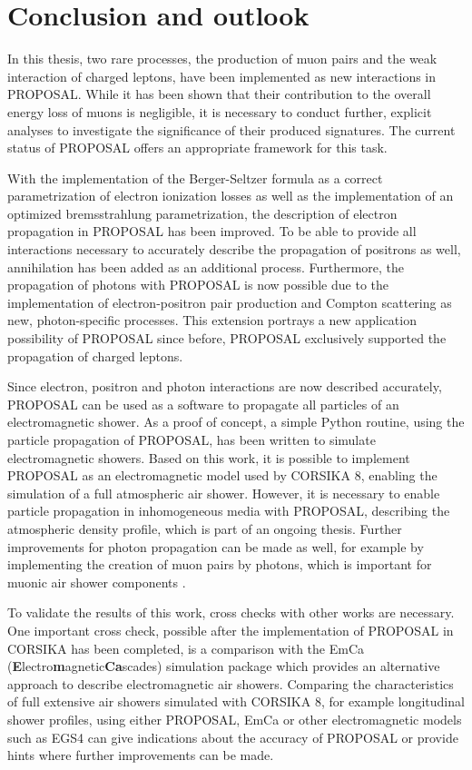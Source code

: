 \chapter{Conclusion and outlook} 

In this thesis, two rare processes, the production of muon pairs and the weak interaction of charged leptons, have been implemented as new interactions in PROPOSAL.
While it has been shown that their contribution to the overall energy loss of muons is negligible, it is necessary to conduct further, explicit analyses to investigate the significance of their produced signatures.
The current status of PROPOSAL offers an appropriate framework for this task.

With the implementation of the Berger-Seltzer formula as a correct parametrization of electron ionization losses as well as the implementation of an optimized bremsstrahlung parametrization, the description of electron propagation in PROPOSAL has been improved.
To be able to provide all interactions necessary to accurately describe the propagation of positrons as well, annihilation has been added as an additional process.
Furthermore, the propagation of photons with PROPOSAL is now possible due to the implementation of electron-positron pair production and Compton scattering as new, photon-specific processes.
This extension portrays a new application possibility of PROPOSAL since before, PROPOSAL exclusively supported the propagation of charged leptons.

Since electron, positron and photon interactions are now described accurately, PROPOSAL can be used as a software to propagate all particles of an electromagnetic shower.
As a proof of concept, a simple Python routine, using the particle propagation of PROPOSAL, has been written to simulate electromagnetic showers.
Based on this work, it is possible to implement PROPOSAL as an electromagnetic model used by CORSIKA 8, enabling the simulation of a full atmospheric air shower.
However, it is necessary to enable particle propagation in inhomogeneous media with PROPOSAL, describing the atmospheric density profile, which is part of an ongoing thesis.
Further improvements for photon propagation can be made as well, for example by implementing the creation of muon pairs by photons, which is important for muonic air shower components \cite{corsika_physics}. 

To validate the results of this work, cross checks with other works are necessary.
One important cross check, possible after the implementation of PROPOSAL in CORSIKA has been completed, is a comparison with the EmCa (\textbf{E}lectro\textbf{m}agnetic\-\textbf{Ca}scades) simulation package \cite{meighenberger2019emca} which provides an alternative approach to describe electromagnetic air showers.
Comparing the characteristics of full extensive air showers simulated with CORSIKA 8, for example longitudinal shower profiles, using either PROPOSAL, EmCa or other electromagnetic models such as EGS4 can give indications about the accuracy of PROPOSAL or provide hints where further improvements can be made.